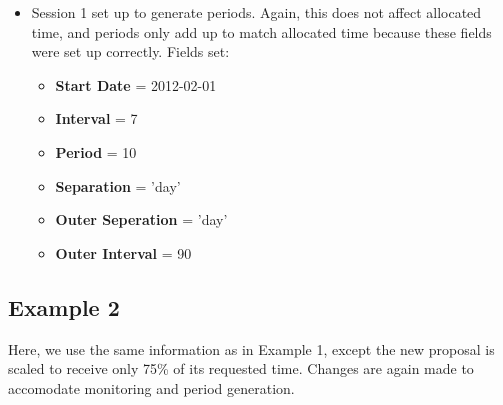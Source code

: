 \documentclass{article}
\begin{document}
\begin{itemize}
\item Session 1 set up to generate periods. Again, this does not affect allocated time, and periods only add up to match allocated time because these fields were set up correctly. Fields set:
    \begin{itemize}
    \item {\bf Start Date } = 2012-02-01
    \item {\bf Interval } = 7
    \item {\bf Period } = 10
    \item {\bf Separation } = 'day'
    \item {\bf Outer Seperation } = 'day'
    \item {\bf Outer Interval } = 90
    \end{itemize}
\end{itemize}

\subsection{Example 2}
Here, we use the same information as in Example 1, except the new proposal is scaled to receive only 75\% of its requested time. Changes are again made to accomodate monitoring and period generation.
\end{document}
